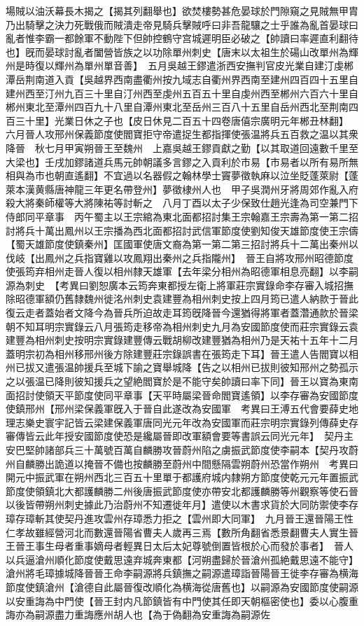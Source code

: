 場賊以油沃幕長木揭之【揭其列翻舉也】欲焚樓勢甚危晏球於門隙窺之見賊無甲胄乃出騎擊之決力死戰俄而賊潰走帝見騎兵擊賊呼曰非吾龍驤之士乎誰為亂首晏球曰亂者惟李霸一都餘軍不動陛下但帥控鶴守宫城遲明臣必破之【帥讀曰率遲直利翻待也】旣而晏球討亂者闔營皆族之以功除單州刺史【唐末以太祖生於碭山改單州為輝州是時復以輝州為單州單音善】　五月吳越王鏐遣浙西安撫判官皮光業自建汀虔郴潭岳荆南道入貢【吳越界西南盡衢州按九域志自衢州界西南至建州四百四十五里自建州西至汀州九百三十里自汀州西至虔州五百五十里自虔州西至郴州六百六十里自郴州東北至潭州四百九十八里自潭州東北至岳州三百八十五里自岳州西北至荆南四百三十里】光業日休之子也【皮日休見二百五十四卷唐僖宗廣明元年郴丑林翻】　六月晉人攻邢州保義節度使閻寶拒守帝遣捉生都指揮使張温將兵五百救之温以其衆降晉　秋七月甲寅朔晉王至魏州　上嘉吳越王鏐貢獻之勤【以其取道回遠數千里至大梁也】壬戌加鏐諸道兵馬元帥朝議多言鏐之入貢利於市易【市易者以所有易所無相與為市也朝直遙翻】不宜過以名器假之翰林學士竇夢徵執麻以泣坐貶蓬萊尉【蓬萊本漢黄縣唐神龍三年更名帶登州】夢徵棣州人也　甲子吳潤州牙將周郊作亂入府殺大將秦師權等大將陳祐等討斬之　八月丁酉以太子少保致仕趙光逢為司空兼門下侍郎同平章事　丙午蜀主以王宗綰為東北面都招討集王宗翰嘉王宗壽為第一第二招討將兵十萬出鳳州以王宗播為西北面都招討武信軍節度使劉知俊天雄節度使王宗儔【蜀天雄節度使鎮秦州】匡國軍使唐文裔為第一第二第三招討將兵十二萬出秦州以伐岐【出鳳州之兵指寶雞以攻鳳翔出秦州之兵指隴州】　晉王自將攻邢州昭德節度使張筠弃相州走晉人復以相州隸天雄軍【去年梁分相州為昭德軍相息亮翻】以李嗣源為刺史　【考異曰劉恕廣本云筠奔東都授左衛上將軍莊宗實錄命李存審入城招撫除昭德軍額仍舊隸魏州徙洺州刺史袁建豐為相州刺史按上四月筠已遣人納款于晉此復云走者蓋始者文降今為晉兵所迫故走耳筠旣降晉今還猶得將軍者蓋濳通款於晉梁朝不知耳明宗實錄云八月張筠走移帝為相州刺史九月為安國節度使而莊宗實錄云袁建豐為相州刺史按明宗實錄建豐傳云戰胡柳改建豐猶為相州乃是天祐十五年十二月蓋明宗初為相州移邢州後方除建豐莊宗錄誤書在張筠走下耳】晉王遣人告閻寶以相州已拔又遣張温帥援兵至城下諭之寶舉城降【告之以相州已拔則彼知邢州之勢孤示之以張温已降則彼知援兵之望絶閻寶於是不能守矣帥讀曰率下同】晉王以寶為東南面招討使領天平節度使同平章事【天平時屬梁晉命閻寶遙領】以李存審為安國節度使鎮邢州【邢州梁保義軍旣入于晉自此遂改為安國軍　考異曰王溥五代會要薛史地理志樂史寰宇記皆云梁建保義軍唐同光元年改為安國軍而莊宗明宗實錄列傳薛史存審傳皆云此年授安國節度使恐是纔屬晉即改軍額會要等書誤云同光元年】　契丹主安巴堅帥諸部兵三十萬號百萬自麟勝攻晉蔚州陷之虜振武節度使李嗣本【契丹攻蔚州自麟勝出詭道以掩晉不備也按麟勝至蔚州中間懸隔雲朔蔚州恐當作朔州　考異曰開元中振武軍在朔州西北三百五十里單于都護府城内隸朔方節度使乾元元年置振武節度使領鎮北大都護麟勝二州後唐振武節度使亦帶安北都護麟勝等州觀察等使石晉以後皆帶朔州刺史據此乃治蔚州不知遷徙年月】遣使以木書求貨於大同防禦使李存璋存璋斬其使契丹進攻雲州存璋悉力拒之【雲州即大同軍】　九月晉王還晉陽王性仁孝故雖經營河北而數還晉陽省曹夫人歲再三焉【數所角翻省悉景翻曹夫人實生晉王晉王事生母者重事嫡母者輕異日太后太妃尊號倒置皆根於心而發於事者】　晉人以兵逼滄州順化節度使戴思遠弃城奔東都【河朔盡歸於晉滄州孤絶戴思遠不能守】滄州將毛璋據城降晉晉王命李嗣源將兵鎮撫之嗣源遣璋詣晉陽晉王徙李存審為横海節度使鎮滄州【滄德自此屬晉復改順化為横海從唐舊也】以嗣源為安國節度使嗣源以安重誨為中門使【晉王封内凡節鎮皆有中門使其任即天朝樞密使也】委以心腹重誨亦為嗣源盡力重誨應州胡人也【為于偽翻為安重誨為嗣源佐
